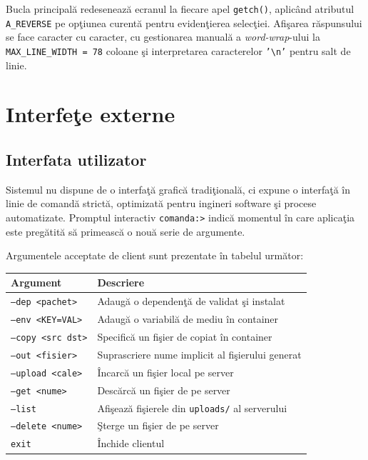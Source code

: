 \documentclass[12pt, a4paper]{article}
\begin{document}
Bucla principal\u{a} redeseneaz\u{a} ecranul la fiecare apel \texttt{getch()}, aplicând atributul
\texttt{A\_REVERSE} pe op\c{t}iunea curent\u{a} pentru eviden\c{t}ierea selec\c{t}iei. Afi\c{s}area
r\u{a}spunsului se face caracter cu caracter, cu gestionarea manual\u{a} a \textit{word-wrap}-ului
la \texttt{MAX\_LINE\_WIDTH = 78} coloane \c{s}i interpretarea caracterelor \texttt{'\textbackslash n'}
pentru salt de linie.

\section{Interfe\c{t}e externe}

\subsection{Interfata utilizator}

Sistemul nu dispune de o interfa\c{t}\u{a} grafic\u{a} tradi\c{t}ional\u{a}, ci expune o interfa\c{t}\u{a}
\^{i}n linie de comand\u{a} strict\u{a}, optimizat\u{a} pentru ingineri software \c{s}i procese
automatizate. Promptul interactiv \texttt{comanda:>} indic\u{a} momentul \^{i}n care aplica\c{t}ia
este preg\u{a}tit\u{a} s\u{a} primeasc\u{a} o nou\u{a} serie de argumente.

Argumentele acceptate de client sunt prezentate \^{i}n tabelul urm\u{a}tor:

\begin{center}
\begin{tabular}{ll}
\toprule
\textbf{Argument} & \textbf{Descriere} \\
\midrule
\texttt{--dep <pachet>}    & Adaug\u{a} o dependen\c{t}\u{a} de validat \c{s}i instalat \\
\texttt{--env <KEY=VAL>}   & Adaug\u{a} o variabil\u{a} de mediu \^{i}n container \\
\texttt{--copy <src dst>}  & Specific\u{a} un fi\c{s}ier de copiat \^{i}n container \\
\texttt{--out <fisier>}    & Suprascriere nume implicit al fi\c{s}ierului generat \\
\texttt{--upload <cale>}   & \^{I}ncarc\u{a} un fi\c{s}ier local pe server \\
\texttt{--get <nume>}      & Desc\u{a}rc\u{a} un fi\c{s}ier de pe server \\
\texttt{--list}            & Afi\c{s}eaz\u{a} fi\c{s}ierele din \texttt{uploads/} al serverului \\
\texttt{--delete <nume>}   & \c{S}terge un fi\c{s}ier de pe server \\
\texttt{exit}              & \^{I}nchide clientul \\
\bottomrule
\end{tabular}
\end{center}
\end{document}
